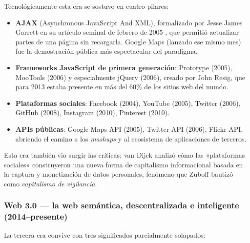 \documentclass[11pt,a4paper,openany]{book}
\begin{document}
Tecnológicamente esta era se sostuvo en cuatro pilares:

\begin{itemize}
\item \textbf{AJAX} (Asynchronous JavaScript And XML), formalizado por
Jesse James Garrett en su artículo seminal de febrero de 2005
\cite{garrett2005ajax}, que permitió actualizar partes de una página
sin recargarla. Google Maps (lanzado ese mismo mes) fue la
demostración pública más espectacular del paradigma.
\item \textbf{Frameworks JavaScript de primera generación}: Prototype
(2005), MooTools (2006) y especialmente jQuery (2006), creado por
John Resig, que para 2013 estaba presente en más del 60\% de los
sitios web del mundo.
\item \textbf{Plataformas sociales}: Facebook (2004), YouTube (2005),
Twitter (2006), GitHub (2008), Instagram (2010), Pinterest (2010).
\item \textbf{APIs públicas}: Google Maps API (2005), Twitter API
(2006), Flickr API, abriendo el camino a los \emph{mashups} y al
ecosistema de aplicaciones de terceros.
\end{itemize}

Esta era también vio surgir las críticas: van Dijck
\cite{vandijck2013culture} analizó cómo las «plataformas sociales»
construyeron una nueva forma de capitalismo informacional basada en
la captura y monetización de datos personales, fenómeno que Zuboff
\cite{zuboff2019capitalismo} bautizó como \emph{capitalismo de
vigilancia}.

\subsubsection{Web 3.0 --- la web semántica, descentralizada e inteligente (2014--presente)}

La tercera era convive con tres significados parcialmente solapados:
\end{document}
